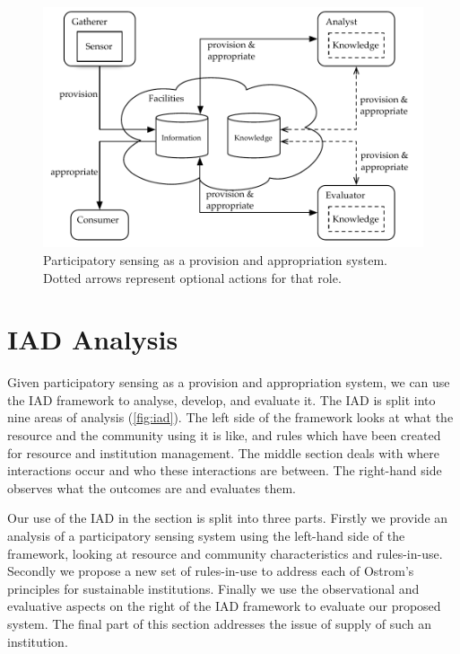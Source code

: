\begin{figure}
\includegraphics[width=\linewidth]{gfx/Prov_and_app_sys_diag}
\caption[Participatory sensing as a provision and appropriation system]{Participatory sensing as a provision and appropriation system. Dotted arrows represent optional actions for that role.}\label{fig:psys}
\end{figure}

\section{IAD Analysis}

Given participatory sensing as a provision and appropriation system, we can use the \ac{IAD} framework to analyse, develop, and evaluate it. 
The \ac{IAD} is split into nine areas of analysis (\autoref{fig:iad}). 
The left side of the framework looks at what the resource and the community using it is like, and rules which have been created for resource and institution management. 
The middle section deals with where interactions occur and who these interactions are between. 
The right-hand side observes what the outcomes are and evaluates them.

Our use of the \ac{IAD} in the section is split into three parts.
Firstly we provide an analysis of a participatory sensing system using the left-hand side of the framework, looking at resource and community characteristics and rules-in-use. 
Secondly we propose a new set of rules-in-use to address each of Ostrom's principles for sustainable institutions. 
Finally we use the observational and evaluative aspects on the right of the \ac{IAD} framework to evaluate our proposed system.
The final part of this section addresses the issue of supply of such an institution.


